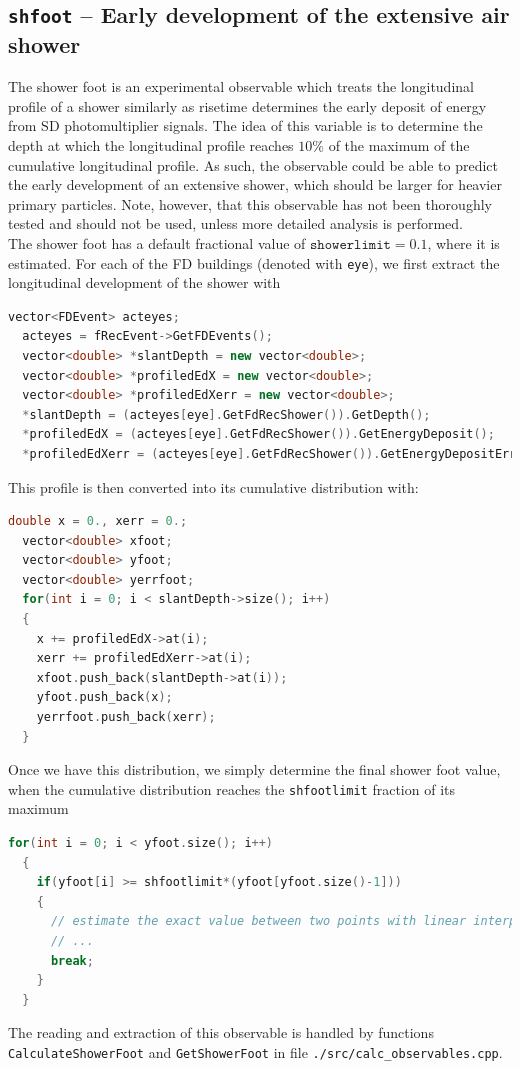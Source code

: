 \documentclass[12pt,a4paper]{report}
\begin{document}
\subsection{\texttt{shfoot} -- Early development of the extensive air shower}
The shower foot is an experimental observable which treats the longitudinal profile of a shower similarly as risetime determines the early deposit of energy from SD photomultiplier signals. The idea of this variable is to determine the depth at which the longitudinal profile reaches $10\%$ of the maximum of the cumulative longitudinal profile. As such, the observable could be able to predict the early development of an extensive shower, which should be larger for heavier primary particles. Note, however, that this observable has not been thoroughly tested and should not be used, unless more detailed analysis is performed.\\
The shower foot has a default fractional value of $\texttt{showerlimit} = 0.1$, where it is estimated. For each of the FD buildings (denoted with \texttt{eye}), we first extract the longitudinal development of the shower with
\begin{lstlisting}[language=C++]
  vector<FDEvent> acteyes;
  acteyes = fRecEvent->GetFDEvents();
  vector<double> *slantDepth = new vector<double>;
  vector<double> *profiledEdX = new vector<double>;
  vector<double> *profiledEdXerr = new vector<double>;
  *slantDepth = (acteyes[eye].GetFdRecShower()).GetDepth();
  *profiledEdX = (acteyes[eye].GetFdRecShower()).GetEnergyDeposit();
  *profiledEdXerr = (acteyes[eye].GetFdRecShower()).GetEnergyDepositError();
\end{lstlisting}
This profile is then converted into its cumulative distribution with:
\begin{lstlisting}[language=C++]
  double x = 0., xerr = 0.;
  vector<double> xfoot;
  vector<double> yfoot;
  vector<double> yerrfoot;
  for(int i = 0; i < slantDepth->size(); i++)
  {
    x += profiledEdX->at(i);
    xerr += profiledEdXerr->at(i);
    xfoot.push_back(slantDepth->at(i));
    yfoot.push_back(x);
    yerrfoot.push_back(xerr);
  }
\end{lstlisting}
Once we have this distribution, we simply determine the final shower foot value, when the cumulative distribution reaches the \texttt{shfootlimit} fraction of its maximum
\begin{lstlisting}[language=C++]
  for(int i = 0; i < yfoot.size(); i++)
  {
    if(yfoot[i] >= shfootlimit*(yfoot[yfoot.size()-1]))
    {
      // estimate the exact value between two points with linear interpolation
      // ...
      break;
    }
  }
\end{lstlisting}
The reading and extraction of this observable is handled by functions \texttt{CalculateShowerFoot} and \texttt{GetShowerFoot} in file \texttt{./src/calc\_observables.cpp}.
\end{document}
